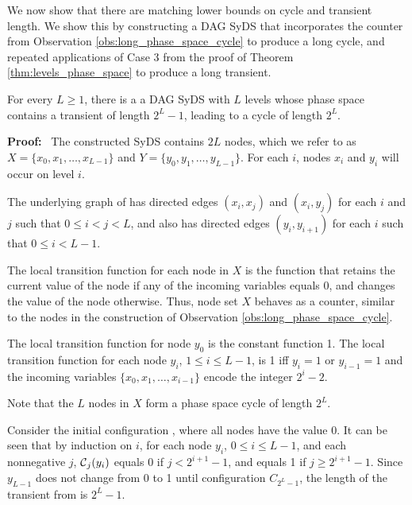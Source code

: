 We now show that there are matching lower bounds on cycle and transient length.
We show this by constructing a DAG SyDS
that incorporates the counter from Observation \ref{obs:long_phase_space_cycle}
to produce a long cycle,
and repeated applications of Case 3 from the proof of Theorem \ref{thm:levels_phase_space}
to produce a long transient.

\begin{theorem}\label{thm:path_length_lower_bounds}
For every $L  \geq 1$,
there is a a DAG SyDS with $L$ levels
whose phase space contains a transient of length $2^L-1$,
leading to a cycle of length $2^L$.
\end{theorem}
\noindent
\textbf{Proof:}~ 
The constructed SyDS \cals{}  contains
$2L$ nodes, which we refer to as $X = \{x_0, x_1, \dots , x_{L-1}\}$ 
and $Y = \{y_0, y_1, \dots , y_{L-1}\}$.
For each $i$, nodes $x_i$ and $y_i$ will occur on level $i$.

The underlying graph of \cals{} has directed edges
$(x_i, x_j)$  and $(x_i, y_j)$ for each $i$ and $j$  such that $0 \leq i < j  < L$,
and also has directed edges $(y_i, y_{i+1})$ for each $i$ such that $0 \leq i < L-1$.

The local transition function for each node in $X$ is the function 
that retains the current value of the node if any of the incoming variables equals 0,
and changes the value of the node otherwise.
Thus, node set $X$ behaves as a counter,
similar to the nodes in the construction of Observation \ref{obs:long_phase_space_cycle}.

The local transition function for node $y_0$ is the constant function 1.
The local transition function for each node $y_i$, $1 \leq i \leq L-1$,
is 1 iff $y_i = 1$ or $y_{i-1} = 1$ and the incoming variables $\{x_0, x_1, \dots , x_{i-1}\}$
encode the integer $2^i-2$.

Note that the $L$ nodes in $X$ form a phase space cycle of length $2^L$.

Consider the initial configuration \calc{}, where all nodes have the value 0.
It can be seen that by induction on $i$, for each node $y_i$, $0 \leq i \leq L-1$,
and each nonnegative $j$, 
$\mbox{$\mathcal{C}$}_j(y_i)$ equals 0 if $j < 2^{i+1} -1$, and equals 1 if $j \geq 2^{i+1} -1$.
Since $y_{L-1}$ does not change from 0 to 1 until configuration $C_{2^L-1}$, 
the length of the transient from \calc{} is $2^L-1$.
\QED
